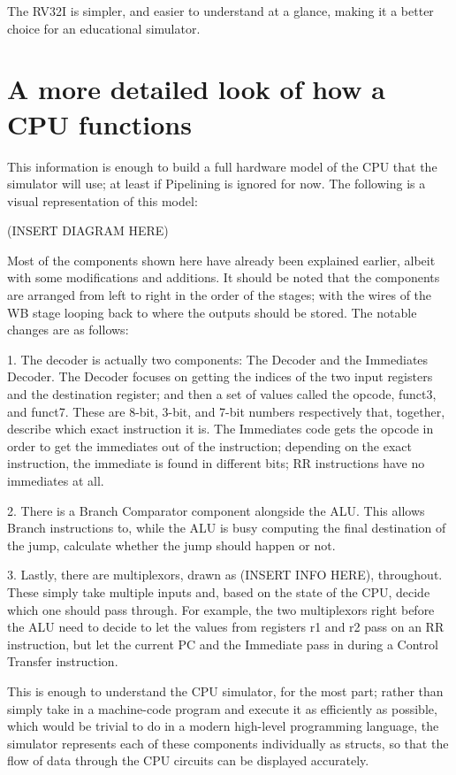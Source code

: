 \documentclass[12pt,twoside]{reedthesis}
\begin{document}
The RV32I is simpler, and easier to understand at a glance, making it a better choice for an educational simulator.

\section{A more detailed look of how a CPU functions}

This information is enough to build a full hardware model of the CPU that the simulator will use; at least if Pipelining is ignored for now. The following is a visual representation of this model:

(INSERT DIAGRAM HERE)

Most of the components shown here have already been explained earlier, albeit with some modifications and additions. It should be noted that the components are arranged from left to right in the order of the stages; with the wires of the WB stage looping back to where the outputs should be stored. The notable changes are as follows:

1. The decoder is actually two components: The Decoder and the Immediates Decoder. The Decoder focuses on getting the indices of the two input registers and the destination register; and then a set of values called the opcode, funct3, and funct7. These are 8-bit, 3-bit, and 7-bit numbers respectively that, together, describe which exact instruction it is. The Immediates code gets the opcode in order to get the immediates out of the instruction; depending on the exact instruction, the immediate is found in different bits; RR instructions have no immediates at all.

2. There is a Branch Comparator component alongside the ALU. This allows Branch instructions to, while the ALU is busy computing the final destination of the jump, calculate whether the jump should happen or not.

3. Lastly, there are multiplexors, drawn as (INSERT INFO HERE), throughout. These simply take multiple inputs and, based on the state of the CPU, decide which one should pass through. For example, the two multiplexors right before the ALU need to decide to let the values from registers r1 and r2 pass on an RR instruction, but let the current PC and the Immediate pass in during a Control Transfer instruction.

This is enough to understand the CPU simulator, for the most part; rather than simply take in a machine-code program and execute it as efficiently as possible, which would be trivial to do in a modern high-level programming language, the simulator represents each of these components individually as structs, so that the flow of data through the CPU circuits can be displayed accurately.
\end{document}
